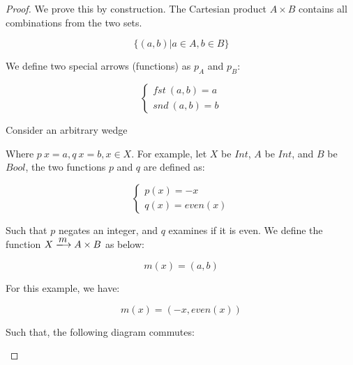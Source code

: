 \documentclass[UTF8]{article}
\begin{document}
\begin{proof}
We prove this by construction. The Cartesian product $A \times B$ contains all combinations from the two sets.

\[
\{(a, b) | a \in A, b \in B\}
\]

We define two special arrows (functions) as $p_A$ and $p_B$:

\[
\begin{cases}
fst\ (a, b) = a \\
snd\ (a, b) = b
\end{cases}
\]

Consider an arbitrary wedge

\begin{center}
\end{center}

Where $p\ x = a, q\ x = b, x \in X$. For example, let $X$ be $Int$, $A$ be $Int$, and $B$ be $Bool$, the two functions $p$ and $q$ are defined as:

\[
\begin{cases}
p(x) = -x \\
q(x) = even(x)
\end{cases}
\]

Such that $p$ negates an integer, and $q$ examines if it is even. We define the function $X \arrowto{m} A \times B$ as below:

\[
m(x) = (a, b)
\]

For this example, we have:

\[
m(x) = (-x, even(x))
\]

Such that, the following diagram commutes:

\begin{center}
\end{center}


\end{proof}
\end{document}
